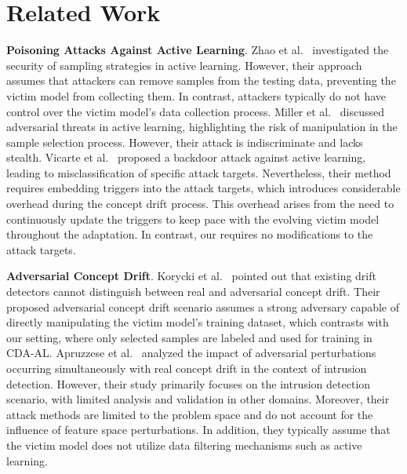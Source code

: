 \section{Related Work}
\label{sec: Related work}
\textbf{Poisoning Attacks Against Active Learning}.
Zhao et al.~\cite{zhao2012sampling} investigated the security of sampling strategies in active learning. 
However, their approach assumes that attackers can remove samples from the testing data, preventing the victim model from collecting them. 
In contrast, attackers typically do not have control over the victim model’s data collection process.
Miller et al.~\cite{miller2014adversarial} discussed adversarial threats in active learning, highlighting the risk of manipulation in the sample selection process. However, their attack is indiscriminate and lacks stealth.
Vicarte et al.~\cite{2021-Usenix-active-learning-backdoor} proposed a backdoor attack against active learning, leading to misclassification of specific attack targets.
Nevertheless, their method requires embedding triggers into the attack targets, which introduces considerable overhead during the concept drift process.
This overhead arises from the need to continuously update the triggers to keep pace with the evolving victim model throughout the adaptation.
In contrast, our \pandora requires no modifications to the attack targets.

\textbf{Adversarial Concept Drift}.
Korycki et al.~\cite{2023-CCF-B-Adversarial-concept-drift-detection-under-poisoning-attacks} pointed out that existing drift detectors cannot distinguish between real and adversarial concept drift. 
Their proposed adversarial concept drift scenario assumes a strong adversary capable of directly manipulating the victim model’s training dataset, which contrasts with our setting, where only selected samples are labeled and used for training in CDA-AL.
Apruzzese et al.~\cite{apruzzese2024adversarial} analyzed the impact of adversarial perturbations occurring simultaneously with real concept drift in the context of intrusion detection.
However, their study primarily focuses on the intrusion detection scenario, with limited analysis and validation in other domains.
Moreover, their attack methods are limited to the problem space and do not account for the influence of feature space perturbations.
In addition, they typically assume that the victim model does not utilize data filtering mechanisms such as active learning.